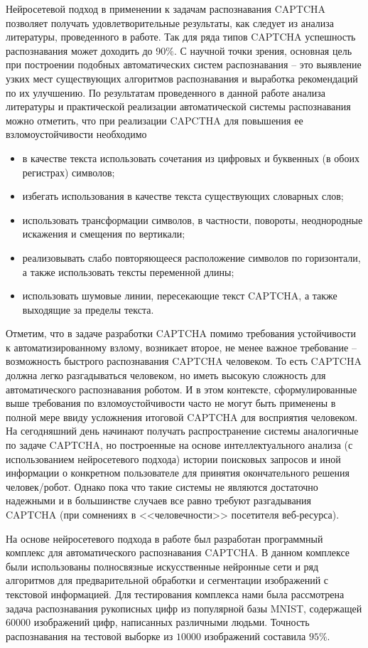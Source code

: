\documentclass[a4paper,12pt,russian]{article} %
\begin{document}
Нейросетевой подход в применении к задачам распознавания CAPTCHA позволяет получать удовлетворительные результаты, как следует из анализа литературы, проведенного в работе.
Так для ряда типов CAPTCHA успешность распознавания может доходить до $90\%$.
С научной точки зрения, основная цель при построении подобных автоматических систем распознавания -- это выявление узких мест существующих алгоритмов распознавания и выработка рекомендаций по их улучшению.
По результатам проведенного в данной работе анализа литературы и практической реализации автоматической системы распознавания можно отметить, что при реализации CAPCTHA для повышения ее взломоустойчивости необходимо
\begin{itemize}
	\item в качестве текста использовать сочетания из цифровых и буквенных (в обоих регистрах) символов;
	\item избегать использования в качестве текста существующих словарных слов;
	\item использовать трансформации символов, в частности, повороты, неоднородные искажения и смещения по вертикали;
	\item реализовывать слабо повторяющееся расположение символов по горизонтали, а также использовать тексты переменной длины;
	\item использовать шумовые линии, пересекающие текст CAPTCHA, а также выходящие за пределы текста. 
\end{itemize}

Отметим, что в задаче разработки CAPTCHA помимо требования устойчивости к автоматизированному взлому, возникает второе, не менее важное требование -- возможность быстрого распознавания CAPTCHA человеком.
То есть CAPTCHA должна легко разгадываться человеком, но иметь высокую сложность для автоматического распознавания роботом.
И в этом контексте, сформулированные выше требования по взломоустойчивости часто не могут быть применены в полной мере ввиду усложнения итоговой CAPTCHA для восприятия человеком.
На сегодняшний день начинают получать распространение системы аналогичные по задаче CAPTCHA, но построенные на основе интеллектуального анализа (с использованием нейросетевого подхода) истории поисковых запросов и иной информации о конкретном пользователе для принятия окончательного решения человек/робот.
Однако пока что такие системы не являются достаточно надежными и в большинстве случаев все равно требуют разгадывания CAPTCHA (при сомнениях в <<человечности>> посетителя веб-ресурса).

На основе нейросетевого подхода в работе был разработан программный комплекс для автоматического распознавания CAPTCHA.
В данном комплексе были использованы полносвязные искусственные нейронные сети и ряд алгоритмов для предварительной обработки и сегментации изображений с текстовой информацией.
Для тестирования комплекса нами была рассмотрена задача распознавания рукописных цифр из популярной базы MNIST, содержащей $60000$ изображений цифр, написанных различными людьми.
Точность распознавания на тестовой выборке из $10000$ изображений составила $95\%$.
\end{document}
